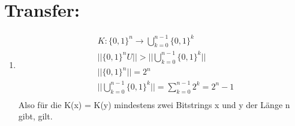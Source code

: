     \section*{Transfer:}
    \begin{enumerate}[label=(\alph*)]
    	\item 
    	\begin{align*}
    		&K:\{0,1\}^n \rightarrow \bigcup _{k=0}^{n-1} \{0,1\}^k \\
        	&||\{0,1\}^n U|| > || \bigcup _{k=0}^{n-1} \{0,1\}^k|| \\
        	&||\{0,1\}^n|| = 2^n \tag{Korollar 1.8}\\
        	&|| \bigcup _{k=0}^{n-1} \{0,1\}^k|| = \sum_{k=0}^{n-1}2^k=2^n-1 \tag{Theorem 1.20}\\
        \end{align*}
        Also für die K(x) = K(y) mindestens zwei Bitstrings x und y der Länge n gibt,  gilt.
    \end{enumerate}








